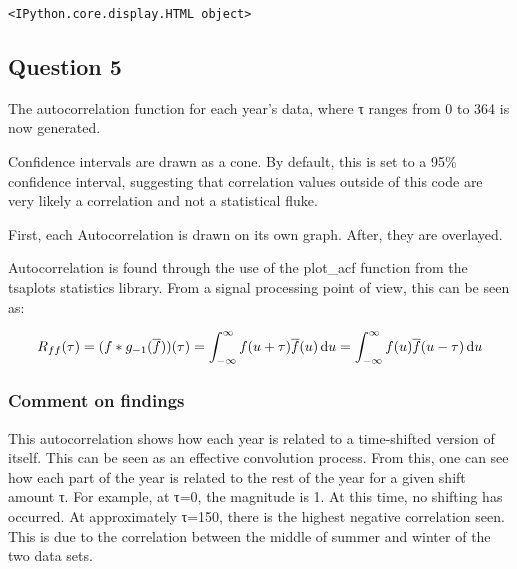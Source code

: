 \documentclass[11pt]{article}
\begin{document}
    
    \begin{verbatim}
<IPython.core.display.HTML object>
    \end{verbatim}

    
    \subsection{Question 5}\label{question-5}

The autocorrelation function for each year's data, where τ ranges from 0
to 364 is now generated.

Confidence intervals are drawn as a cone. By default, this is set to a
95\% confidence interval, suggesting that correlation values outside of
this code are very likely a correlation and not a statistical fluke.

First, each Autocorrelation is drawn on its own graph. After, they are
overlayed.

Autocorrelation is found through the use of the plot\_acf function from
the tsaplots statistics library. From a signal processing point of view,
this can be seen as:

\[R_{ff}(\tau) = (f * g_{-1}(\overline{f}))(\tau) = \int_{-\infty}^\infty f(u+\tau)\overline{f}(u)\, {\rm d}u = \int_{-\infty}^\infty f(u)\overline{f}(u-\tau)\, {\rm d}u\]

\subsubsection{Comment on findings}\label{comment-on-findings}

This autocorrelation shows how each year is related to a time-shifted
version of itself. This can be seen as an effective convolution process.
From this, one can see how each part of the year is related to the rest
of the year for a given shift amount τ. For example, at τ=0, the
magnitude is 1. At this time, no shifting has occurred. At approximately
τ=150, there is the highest negative correlation seen. This is due to
the correlation between the middle of summer and winter of the two data
sets.
\end{document}
